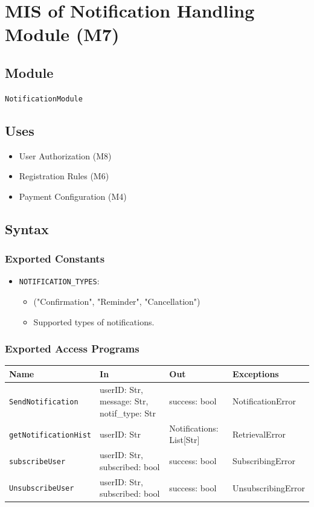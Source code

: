 \documentclass[12pt, titlepage]{article}
\begin{document}
\section{MIS of Notification Handling Module (M7)} \label{MIS_M7}

\subsection{Module}

\texttt{NotificationModule}

\subsection{Uses}
\begin{itemize}
    \item User Authorization (M8)
    \item Registration Rules (M6)
    \item Payment Configuration (M4)
\end{itemize}

\subsection{Syntax}

\subsubsection{Exported Constants}
\begin{itemize}
    \item \texttt{NOTIFICATION\_TYPES}: 
    \begin{itemize}
        \item ("Confirmation", "Reminder", "Cancellation")
        \item Supported types of notifications.
    \end{itemize}
\end{itemize}

\subsubsection{Exported Access Programs}

\begin{center}
\begin{tabular}{p{4cm} p{4cm} p{4cm} p{4cm}}
\hline
\textbf{Name} & \textbf{In} & \textbf{Out} & \textbf{Exceptions} \\
\hline
\texttt{SendNotification} & userID: Str, message: Str, notif\_type: Str & success: bool & NotificationError \\
\texttt{getNotificationHist} & userID: Str & Notifications: List[Str] & RetrievalError \\
\texttt{subscribeUser} & userID: Str, subscribed: bool & success: bool & SubscribingError \\
\texttt{UnsubscribeUser} & userID: Str, subscribed: bool & success: bool & UnsubscribingError \\
\hline
\end{tabular}
\end{center}
\end{document}
